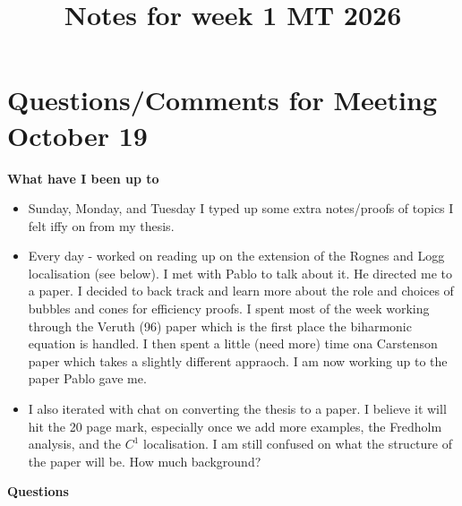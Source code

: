 \documentclass[12pt,a4paper]{article}
\title{\textbf{Notes for week 1 MT 2026}}
\author{}
\date{}
\begin{document}
\maketitle

\section{Questions/Comments for Meeting October 19}


\textbf{What have I been up to}

\begin{itemize}
    \item Sunday, Monday, and Tuesday I typed up some extra notes/proofs of topics I felt iffy on from my thesis. 
    \item Every day - worked on reading up on the extension of the Rognes and Logg localisation (see below). I met with Pablo to talk about it. He directed me to a paper. I decided to back track and learn more about the role and choices of bubbles and cones for efficiency proofs. I spent most of the week working through the Veruth (96) paper which is the first place the biharmonic equation is handled. I then spent a little (need more) time ona Carstenson paper which takes a slightly different appraoch. I am now working up to the paper Pablo gave me.
    \item I also iterated with chat on converting the thesis to a paper. I believe it will hit the 20 page mark, especially once we add more examples, the Fredholm analysis, and the $C^1$ localisation. I am still confused on what the structure of the paper will be. How much background? 
\end{itemize}

\textbf{Questions}
\end{document}
